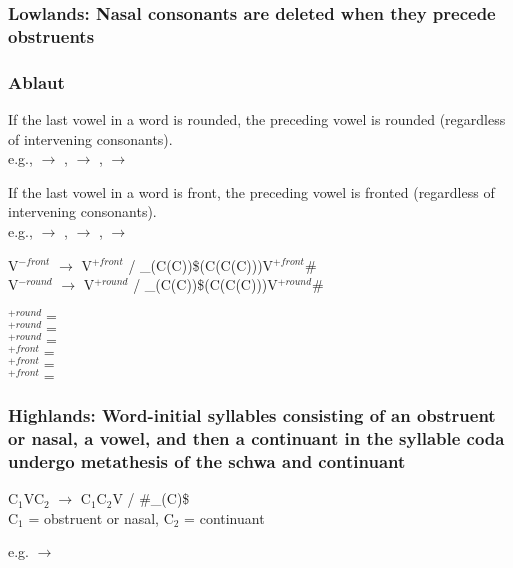 \subsubsection{{\sc Lowlands:} Nasal consonants are deleted when they precede obstruents}

\subsubsection{Ablaut}

If the last vowel in a word is rounded, the preceding vowel is rounded (regardless of intervening consonants).\\
e.g.,   $\to$ ,   $\to$ ,   $\to$ 

If the last vowel in a word is front, the preceding vowel is fronted (regardless of intervening consonants).\\
e.g.,   $\to$ ,   $\to$ ,   $\to$ 

\begin{center}
    V$^{-front}$ $\to$ V$^{+front}$ / \_(C(C))\$(C(C(C)))V$^{+front}$\#\\
    V$^{-round}$ $\to$ V$^{+round}$ / \_(C(C))\$(C(C(C)))V$^{+round}$\#
\end{center}

\begin{center}
    $^{+round} = $ \\
    $^{+round} = $ \\
    $^{+round} = $ \bripa{\ahoh}\\
    $^{+front} = $ \bripa{\aesh}\\
    $^{+front} = $ \\
    $^{+front} = $ \\
\end{center}

\subsubsection{{\sc Highlands:} Word-initial syllables consisting of an obstruent or nasal, a vowel, and then a continuant in the syllable coda undergo metathesis of the schwa and continuant}

\begin{center}
    C$_1$VC$_2$ $\to$ C$_1$C$_2$V / \#\_(C)\$\\
    C$_1$ = obstruent or nasal, C$_2$ = continuant
\end{center}

e.g.   $\to$ 


\subsubsection{}